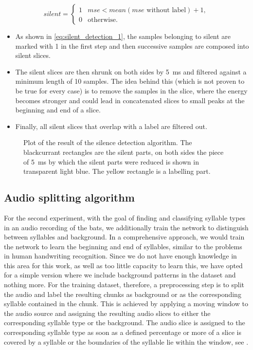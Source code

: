 \begin{equation}\label{eq:silent_detection_1}
silent = \begin{cases} 1 & mse < mean(mse \text{ without label})+1, \\ 0 & \text{otherwise}. \end{cases}
\end{equation}
\begin{itemize}
    \item As shown in \ref{eq:silent_detection_1}, the samples belonging to silent are marked with 1 in the first step and then successive samples are composed into silent slices.
    \item The silent slices are then shrunk on both sides by \SI{5}{\milli\second} and filtered against a minimum length of 10 samples. The idea behind this (which is not proven to be true for every case) is to remove the samples in the slice, where the energy becomes stronger and could lead in concatenated slices to small peaks at the beginning and end of a slice.
    \item Finally, all silent slices that overlap with a label are filtered out.
\end{itemize}
\begin{figure}[H]
\centering
  
  \caption{Plot of the result of the silence detection algorithm. The blackcurrant rectangles are the silent parts, on both sides the piece of \SI{5}{\milli\second} by which the silent parts were reduced is shown in transparent light blue. The yellow rectangle is a labelling part.}
  \label{fig:silent_detection_sample1}
\end{figure}

\subsection{Audio splitting algorithm}\label{sec:splitting_algorithm}
For the second experiment, with the goal of finding and classifying syllable types in an audio recording of the bats, we additionally train the network to distinguish between syllables and background.
In a comprehensive approach, we would train the network to learn the beginning and end of syllables, similar to the problems in human handwriting recognition.
Since we do not have enough knowledge in this area for this work, as well as too little capacity to learn this, we have opted for a simple version where we include background patterns in the dataset and nothing more.
For the training dataset, therefore, a preprocessing step is to split the audio and label the resulting chunks as background or as the corresponding syllable contained in the chunk.
This is achieved by applying a moving window to the audio source and assigning the resulting audio slices to either the corresponding syllable type or the background.
The audio slice is assigned to the corresponding syllable type as soon as a defined percentage or more of a slice is covered by a syllable or the boundaries of the syllable lie within the window, see .

